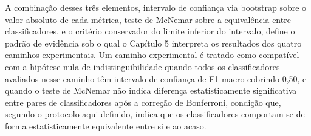 A combinação desses três elementos, intervalo de confiança via bootstrap sobre o valor absoluto de cada métrica, teste de McNemar sobre a equivalência entre classificadores, e o critério conservador do limite inferior do intervalo, define o padrão de evidência sob o qual o Capítulo 5 interpreta os resultados dos quatro caminhos experimentais. Um caminho experimental é tratado como compatível com a hipótese nula de indistinguibilidade quando todos os classificadores avaliados nesse caminho têm intervalo de confiança de F1-macro cobrindo 0,50, e quando o teste de McNemar não indica diferença estatisticamente significativa entre pares de classificadores após a correção de Bonferroni, condição que, segundo o protocolo aqui definido, indica que os classificadores comportam-se de forma estatisticamente equivalente entre si e ao acaso.































